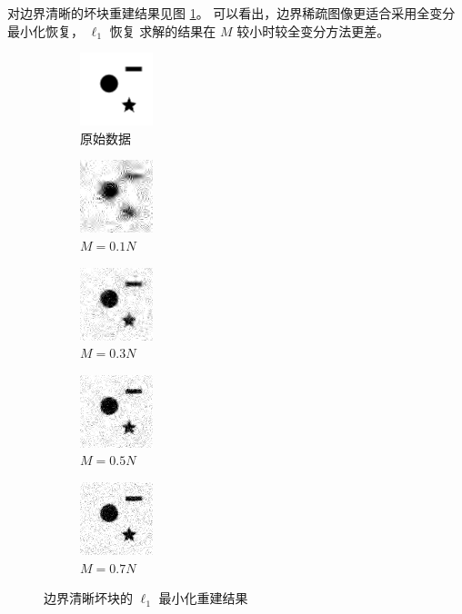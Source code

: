 对边界清晰的坏块重建结果见图 \ref{fig:L12dsharp}。
可以看出，边界稀疏图像更适合采用全变分最小化恢复， $\ell_1$ 恢复
求解的结果在 $M$ 较小时较全变分方法更差。

\begin{figure}
\centering
\begin{subfigure}[t]{1.1in}
	\includegraphics{Figure/testdata/2dsharp.png}
	\caption{原始数据}
\end{subfigure}
\begin{subfigure}[t]{1.1in}
	\includegraphics{Figure/L1/2dsharp10.png}
	\caption{$M = 0.1 N$}
\end{subfigure}
\begin{subfigure}[t]{1.1in}
	\includegraphics{Figure/L1/2dsharp30.png}
	\caption{$M = 0.3 N$}
\end{subfigure}
\begin{subfigure}[t]{1.1in}
	\includegraphics{Figure/L1/2dsharp50.png}
	\caption{$M = 0.5 N$}
\end{subfigure}
\begin{subfigure}[t]{1.1in}
	\includegraphics{Figure/L1/2dsharp70.png}
	\caption{$M = 0.7 N$}
\end{subfigure}
\caption{边界清晰坏块的 $\ell_1$ 最小化重建结果}
\label{fig:L12dsharp}
\end{figure}

